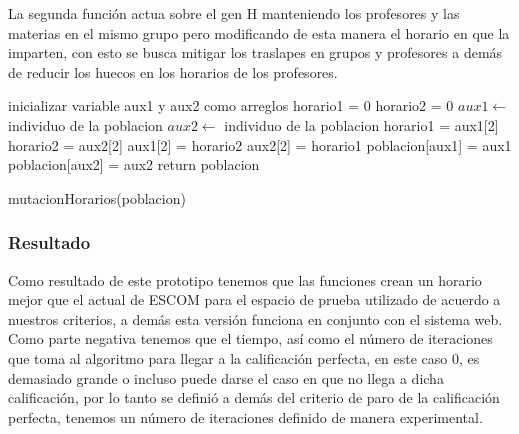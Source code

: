La segunda función actua sobre el gen H manteniendo los profesores y las materias en el mismo grupo pero modificando de esta manera el horario en que la imparten, con esto se busca mitigar los traslapes en grupos y profesores a demás de reducir los huecos en los horarios de los profesores.\\

\begin{algorithm}[H]
	\DontPrintSemicolon
	\SetAlgoLined
	inicializar variable aux1 y aux2 como arreglos\;
	horario1 = 0\;
	horario2 = 0\;
	$aux1 \leftarrow $ individuo de la poblacion\;
	$aux2 \leftarrow $ individuo de la poblacion\;
	horario1 = aux1[2]\;
	horario2 = aux2[2]\;
	aux1[2] = horario2\;
	aux2[2] = horario1\;
	poblacion[aux1] = aux1\;
	poblacion[aux2] = aux2\;
	return poblacion \;
	\caption{mutacionHorarios(poblacion)}
	\end{algorithm}  

\subsubsection{Resultado}

Como resultado de este prototipo tenemos que las funciones crean un horario mejor que el actual de ESCOM para el espacio de prueba utilizado de acuerdo a nuestros criterios, a demás esta versión funciona en conjunto con el sistema web.\\

Como parte negativa tenemos que el tiempo, así como el número de iteraciones que toma al algoritmo para llegar a la calificación perfecta, en este caso 0, es demasiado grande o incluso puede darse el caso en que no llega a dicha calificación, por lo tanto se definió a demás del criterio de paro de la calificación perfecta, tenemos un número de iteraciones definido de manera experimental.\\